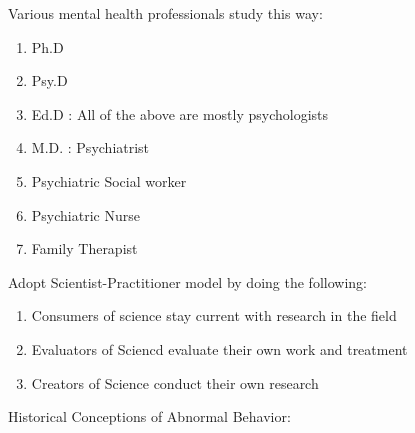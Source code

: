 \documentclass[12pt]{article}
\begin{document}
Various mental health professionals study this way:
\begin{enumerate}
\item Ph.D
\item Psy.D
\item Ed.D : All of the above are mostly psychologists
\item M.D. : Psychiatrist
\item Psychiatric Social worker
\item Psychiatric Nurse
\item Family Therapist
\end{enumerate}
Adopt Scientist-Practitioner model by doing the following:
\begin{enumerate}
\item Consumers of science stay current with research in the field
\item Evaluators of Sciencd evaluate their own work and treatment
\item Creators of Science conduct their own research
\end{enumerate}
Historical Conceptions of Abnormal Behavior:
\end{document}
